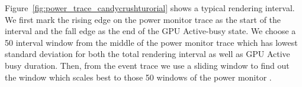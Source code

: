 Figure~\ref{fig:power_trace_candycrushturorial} shows a typical rendering interval.
We first mark the rising edge on the power monitor trace as the start of the interval and 
the fall edge as the end of the GPU Active-busy state.
We choose a 50 interval window from the middle of the power monitor trace which has lowest standard deviation
for both the total rendering interval as well as GPU Active busy duration.
Then, from the event trace we use a sliding window to find out the window 
which scales best to those 50 windows of the power monitor  .
